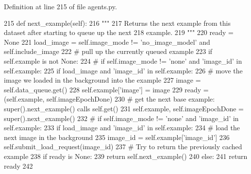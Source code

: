 Definition at line 215 of file agents.\+py.


\begin{DoxyCode}
215     \textcolor{keyword}{def }next\_example(self):
216         \textcolor{stringliteral}{"""}
217 \textcolor{stringliteral}{        Returns the next example from this dataset after starting to queue up the next}
218 \textcolor{stringliteral}{        example.}
219 \textcolor{stringliteral}{        """}
220         ready = \textcolor{keywordtype}{None}
221         load\_image = self.image\_mode != \textcolor{stringliteral}{'no\_image\_model'} \textcolor{keywordflow}{and} self.include\_image
222         \textcolor{comment}{# pull up the currently queued example}
223         \textcolor{keywordflow}{if} self.example \textcolor{keywordflow}{is} \textcolor{keywordflow}{not} \textcolor{keywordtype}{None}:
224             \textcolor{comment}{# if self.image\_mode != 'none' and 'image\_id' in self.example:}
225             \textcolor{keywordflow}{if} load\_image \textcolor{keywordflow}{and} \textcolor{stringliteral}{'image\_id'} \textcolor{keywordflow}{in} self.example:
226                 \textcolor{comment}{# move the image we loaded in the background into the example}
227                 image = self.data\_queue.get()
228                 self.example[\textcolor{stringliteral}{'image'}] = image
229             ready = (self.example, self.imageEpochDone)
230         \textcolor{comment}{# get the next base example: super().next\_example() calls self.get()}
231         self.example, self.imageEpochDone = super().next\_example()
232         \textcolor{comment}{# if self.image\_mode != 'none' and 'image\_id' in self.example:}
233         \textcolor{keywordflow}{if} load\_image \textcolor{keywordflow}{and} \textcolor{stringliteral}{'image\_id'} \textcolor{keywordflow}{in} self.example:
234             \textcolor{comment}{# load the next image in the background}
235             image\_id = self.example[\textcolor{stringliteral}{'image\_id'}]
236             self.submit\_load\_request(image\_id)
237         \textcolor{comment}{# Try to return the previously cached example}
238         \textcolor{keywordflow}{if} ready \textcolor{keywordflow}{is} \textcolor{keywordtype}{None}:
239             \textcolor{keywordflow}{return} self.next\_example()
240         \textcolor{keywordflow}{else}:
241             \textcolor{keywordflow}{return} ready
242 
\end{DoxyCode}
\mbox{\label{classparlai_1_1tasks_1_1image__chat_1_1agents_1_1ImageChatTeacher_ae37398f75ec883f5bbf276bf7b2cf715}} 
